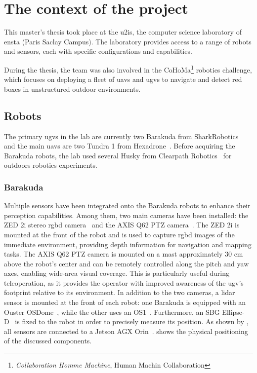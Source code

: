 \chapter{The context of the project}\label{ch:context}

This master's thesis took place at the \gls{u2is}, the computer science laboratory of \gls{ensta} (Paris Saclay Campus).
The laboratory provides access to a range of robots and sensors, each with specific configurations and capabilities.

During the thesis, the team was also involved in the CoHoMa\footnote{\textit{Collaboration Homme Machine}, Human Machin Collaboration} robotics challenge, which
focuses on deploying a fleet of \glspl{uav} and \glspl{ugv} to navigate and detect red boxes in unstructured outdoor environments.


\section{Robots}\label{sec:robots}

The primary \gls{ugv}s in the lab are currently two Barakuda from SharkRobotics~\cite{noauthor_barakuda_nodate}
and the main \gls{uav}s are two Tundra 1 from Hexadrone~\cite{noauthor_tundra_nodate}.
Before acquiring the Barakuda robots, the lab used several Husky from Clearpath Robotics~\cite{noauthor_husky_nodate} for
outdoors robotics experiments.

\subsection{Barakuda}\label{subsec:barakuda}

Multiple sensors have been integrated onto the Barakuda robots to enhance their perception capabilities.
Among them, two main cameras have been installed: the ZED 2i stereo \gls{rgbd} camera~\cite{noauthor_zed_nodate} and the AXIS Q62 PTZ camera~\cite{noauthor_axis_nodate}.
The ZED 2i is mounted at the front of the robot and is used to capture \gls{rgbd} images of the immediate environment, providing depth information for navigation and mapping tasks.
The AXIS Q62 PTZ camera is mounted on a mast approximately 30 cm above the robot's center and can be remotely controlled along the pitch and yaw axes, enabling wide-area visual coverage.
This is particularly useful during teleoperation, as it provides the operator with improved awareness of the \gls{ugv}'s footprint relative to its environment.
In addition to the two cameras, a \gls{lidar} sensor is mounted at the front of each robot: one Barakuda is equipped with an Ouster OSDome~\cite{noauthor_ouster_nodate},
while the other uses an OS1~\cite{noauthor_os1_nodate}.
Furthermore, an SBG Ellipse-D~\cite{noauthor_ellipse-d_nodate} is fixed to the robot in order to precisely measure its position.
As shown by , all sensors are connected to a Jetson AGX Orin~\cite{noauthor_nvidia_nodate}.
 shows the physical positioning of the discussed components.


